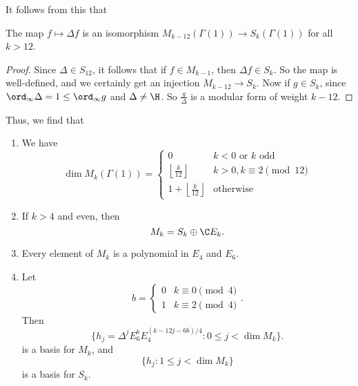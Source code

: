 \documentclass[a4paper]{article}
\begin{document}
It follows from this that
\begin{prop}
  The map $f \mapsto \Delta f$ is an isomorphism $M_{k - 12}(\Gamma(1)) \to S_k(\Gamma(1))$ for all $k > 12$.
\end{prop}

\begin{proof}
  Since $\Delta \in S_{12}$, it follows that if $f \in M_{k - 1}$, then $\Delta f \in S_k$. So the map is well-defined, and we certainly get an injection $M_{k - 12} \to S_k$. Now if $g \in S_k$, since $\ord_\infty \Delta = 1 \leq \ord_\infty g$ and $\Delta \not= \H$. So $\frac{g}{\Delta}$ is a modular form of weight $k - 12$.
\end{proof}

Thus, we find that
\begin{thm}\leavevmode
  \begin{enumerate}
    \item We have
      \[
        \dim M_k (\Gamma(1)) =
        \begin{cases}
          0 & k < 0\text{ or }k \text{ odd }\\
          \left\lfloor \frac{k}{12}\right\rfloor & k > 0, k \equiv 2 \pmod{12}\\
          1 + \left\lfloor \frac{k}{12}\right\rfloor & \text{otherwise}
        \end{cases}
      \]
    \item If $k > 4$ and even, then
      \[
        M_k = S_k \oplus \C E_k.
      \]
    \item Every element of $M_k$ is a polynomial in $E_4$ and $E_6$.
    \item Let
      \[
        b =
        \begin{cases}
          0 & k\equiv 0 \pmod 4\\
          1 & k\equiv 2 \pmod 4
        \end{cases}.
      \]
      Then
      \[
        \{h_j = \Delta^j E_6^b E_4^{(k - 12j - 6b)/4} : 0 \leq j < \dim M_k\}.
      \]
      is a basis for $M_k$, and
      \[
        \{h_j : 1 \leq j < \dim M_k\}
      \]
      is a basis for $S_k$.
  \end{enumerate}
\end{thm}
\end{document}
